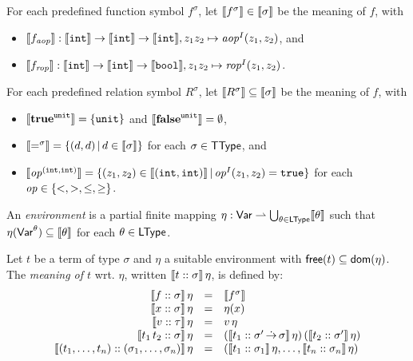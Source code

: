 \documentclass[12pt,a4paper]{article}
\newcommand{\aop}{\nstyle{aop}}
\newcommand{\rop}{\nstyle{rop}}
\begin{document}
For each predefined function symbol $f^\sigma$, let $\llbracket f^\sigma\rrbracket\in\llbracket\sigma\rrbracket$ be the meaning of
$f$, with
\begin{itemize}
\item $\semantic{f_\aop} : \semantic{\tint} \to \semantic{\tint} \to \semantic{\tint},
  z_1 z_2 \mapsto \aop^I(z_1,z_2)$, and
\item $\semantic{f_\rop} : \semantic{\tint} \to \semantic{\tint} \to \semantic{\tbool},
  z_1 z_2 \mapsto \rop^I(z_1,z_2)$.
\end{itemize}
For each predefined relation symbol $R^\sigma$, let $\llbracket R^\sigma\rrbracket\subseteq\llbracket\sigma\rrbracket$ be the meaning
of $f$, with
\begin{itemize}
\item $\llbracket\mathbf{true}^{\mathtt{unit}}\rrbracket = \{\mathtt{unit}\}$ and $\llbracket\mathbf{false}^{\mathtt{unit}}\rrbracket = \emptyset$,
\item $\llbracket=^\sigma\rrbracket = \{(d,d)\,|\,d\in\llbracket\sigma\rrbracket\}$ for each $\sigma\in\mathsf{TType}$, and
\item $\llbracket\mathit{op}^{(\mathtt{int},\mathtt{int})}\rrbracket = \{(z_1,z_2)\in\llbracket(\mathtt{int},\mathtt{int})\rrbracket\,|\,\mathit{op}^I(z_1,z_2)=\mathtt{true}\}$
  for each $\mathit{op}\in\{<,>,\le,\ge\}$.
\end{itemize}

An {\em environment} is a partial finite mapping $\eta:\mathsf{Var} \rightharpoonup \bigcup_{\theta\in\mathsf{LType}}\llbracket\theta\rrbracket$ such
that $\eta(\mathsf{Var}^\theta) \subseteq \llbracket\theta\rrbracket$ for each $\theta\in\mathsf{LType}$.

\begin{definition}
  Let $t$ be a term of type $\sigma$ and $\eta$ a suitable environment with $\mathsf{free}(t) \subseteq \mathsf{dom}(\eta)$.
  The {\em meaning of $t$} wrt. $\eta$, written $\llbracket{t}\mathrel{::}{\sigma}\rrbracket\,\eta$, is defined by:
  \[\begin{array}{rcl}
    \llbracket{f}\mathrel{::}{\sigma}\rrbracket\,\eta
    &=& \llbracket f^\sigma\rrbracket \\
    \llbracket{x}\mathrel{::}{\sigma}\rrbracket\,\eta
    &=& \eta(x) \\
    \llbracket{v}\mathrel{::}{\tau}\rrbracket\,\eta
    &=& v\,\eta \\
    \llbracket{t_1\,t_2}\mathrel{::}{\sigma}\rrbracket\,\eta
    &=& (\llbracket{t_1}\mathrel{::}{\sigma'\operatorname{\dot{\to}}\sigma}\rrbracket\,\eta)\,(\llbracket{t_2}\mathrel{::}{\sigma'}\rrbracket\,\eta) \\
    \llbracket{(t_1,\ldots,t_n)}\mathrel{::}{(\sigma_1,\ldots,\sigma_n)}\rrbracket\,\eta
    &=& (\llbracket{t_1}\mathrel{::}{\sigma_1}\rrbracket\,\eta,\ldots,\llbracket{t_n}\mathrel{::}{\sigma_n}\rrbracket\,\eta) 
  \end{array}\]
\end{definition}
\end{document}
